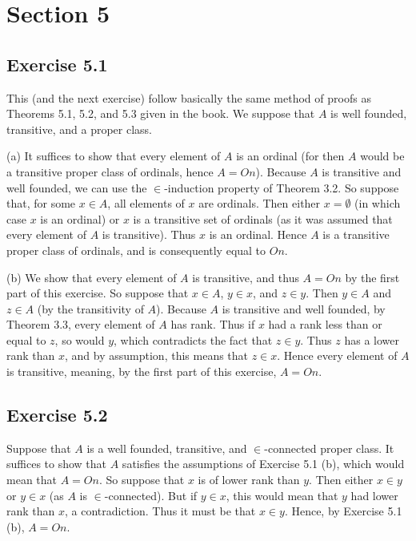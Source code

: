\documentclass{article}
\theoremstyle{definition}
\begin{document}
\section*{Section 5}

\subsection*{Exercise 5.1}
This (and the next exercise) follow basically the same method of proofs as Theorems 5.1, 5.2, and 5.3 given in the book. We suppose that 
$A$ is well founded, transitive, and a proper class.

(a) It suffices to show that every element of $A$ is an ordinal (for then $A$ would be a transitive proper class of ordinals, hence $A=On$). 
Because $A$ is transitive and well founded, we can use the $\in$-induction property of Theorem 3.2. So suppose that, for some $x\in A$, all 
elements of $x$ are ordinals. Then either $x=\emptyset$ (in which case $x$ is an ordinal) or $x$ is a transitive set of ordinals
(as it was assumed that every element of $A$ is transitive). Thus $x$ is an ordinal.
	Hence $A$ is a transitive proper class of ordinals, and is consequently equal to $On$.

(b) We show that every element of $A$ is transitive, and thus $A=On$ by the first part of this exercise.
	So suppose that $x\in A$, $y\in x$, and $z\in y$. Then $y\in A$ and $z\in A$ (by the transitivity of $A$). Because 
$A$ is transitive and well founded, by Theorem 3.3, every element of $A$ has rank. Thus if $x$ had a rank less than or equal to $z$, so would 
$y$, which contradicts the fact that $z\in y$. Thus $z$ has a lower rank than $x$, and by assumption, this means that $z\in x$.
Hence every element of $A$ is transitive, meaning, by the first part of this exercise, $A=On$.

\subsection*{Exercise 5.2}
	Suppose that $A$ is a well founded, transitive, and $\in$-connected proper class. It suffices to show that $A$ satisfies the assumptions of 
Exercise 5.1 (b), which would mean that $A=On$.
	So suppose that $x$ is of lower rank than $y$. Then either $x\in y$ or $y\in x$ (as $A$ is $\in$-connected). But if $y\in x$, this would mean 
that $y$ had lower rank than $x$, a contradiction. Thus it must be that $x\in y$. 
	Hence, by Exercise 5.1 (b), $A=On$.
\end{document}
